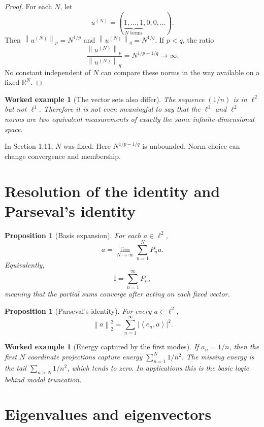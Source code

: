 \documentclass[11pt,a5paper,oneside,openany]{scrreprt}
\theoremstyle{notes}
\newtheorem{proposition}[theorem]{Proposition}
\theoremstyle{definitions}
\newtheorem{example}[theorem]{Worked example}
\newcommand{\R}{\mathbb{R}}
\newcommand{\ip}[2]{\left\langle #1,#2\right\rangle}
\newcommand{\norm}[1]{\left\lVert #1\right\rVert}
\newcommand{\Id}{\mathrm{I}}
\begin{document}
\begin{proof}
For each $N$, let
\[
 u^{(N)}=(\underbrace{1,\ldots,1}_{N\text{ terms}},0,0,\ldots).
\]
Then $\norm{u^{(N)}}_p=N^{1/p}$ and
$\norm{u^{(N)}}_q=N^{1/q}$.  If $p<q$, the ratio
\[
 \frac{\norm{u^{(N)}}_p}{\norm{u^{(N)}}_q}
 =N^{1/p-1/q}\longrightarrow\infty.
\]
No constant independent of $N$ can compare these norms in the way available
on a fixed $\R^N$.
\end{proof}

\begin{example}[The vector sets also differ]
The sequence $(1/n)$ is in $\ell^2$ but not $\ell^1$.  Therefore it is not
even meaningful to say that the $\ell^1$ and $\ell^2$ norms are two equivalent
measurements of exactly the same infinite-dimensional space.
\end{example}

\begin{caution}
In Section 1.11, $N$ was fixed.  Here $N^{1/p-1/q}$ is unbounded.  Norm choice
can change convergence and membership.
\end{caution}

\section{Resolution of the identity and Parseval's identity}

\begin{proposition}[Basis expansion]
For each $a\in\ell^2$,
\[
  a=\lim_{N\to\infty}\sum_{n=1}^{N}P_na.
\]
Equivalently,
\[
  \boxed{\Id=\sum_{n=1}^{\infty}P_n},
\]
meaning that the partial sums converge after acting on each fixed vector.
\end{proposition}

\begin{proposition}[Parseval's identity]
For every $a\in\ell^2$,
\[
  \boxed{\norm{a}_2^2=\sum_{n=1}^{\infty}|\ip{e_n}{a}|^2}.
\]
\end{proposition}

\begin{example}[Energy captured by the first modes]
If $a_n=1/n$, then the first $N$ coordinate projections capture energy
$\sum_{n=1}^{N}1/n^2$.  The missing energy is the tail
$\sum_{n>N}1/n^2$, which tends to zero.  In applications this is the basic
logic behind modal truncation.
\end{example}

\section{Eigenvalues and eigenvectors}
\end{document}
